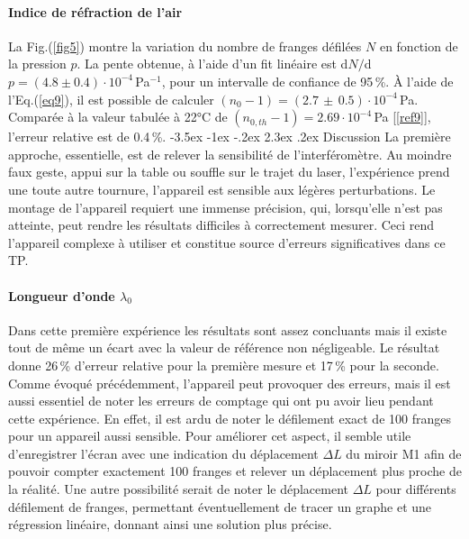 \documentclass[a4paper, 12pt,oneside]{article}
\makeatletter
\renewcommand{\section}{\@startsection {section}{1}{\z@}%
             {-3.5ex \@plus -1ex \@minus -.2ex}%
             {2.3ex \@plus.2ex}%
             {\normalfont\normalsize\bfseries}}
\makeatother
\begin{document}
\paragraph{Indice de réfraction de l'air}

La Fig.(\ref{fig5}) montre la variation du nombre de franges défilées $N$ en fonction de la pression $p$. La pente obtenue, à l'aide d'un fit linéaire est d$N/$d$p=(4.8\pm0.4) \cdot 10^{-4}$\,Pa$^{-1}$, pour un intervalle de confiance de 95\,\%. À l'aide de l'Eq.(\ref{eq9}), il est possible de calculer $(n_0 - 1) = (2.7 \,\pm\, 0.5) \cdot 10^{-4}$\,Pa. Comparée à la valeur tabulée à 22°C de $(n_{0,th} - 1) = 2.69 \cdot 10^{-4}$\,Pa  [\ref{ref9}], l'erreur relative est de 0.4\,\%.
\vspace{-0.3cm}
\section{Discussion}
\vspace{-0.3cm}
La première approche, essentielle, est de relever la sensibilité de l'interféromètre. Au moindre faux geste, appui sur la table ou souffle sur le trajet du laser, l'expérience prend une toute autre tournure, l'appareil est sensible aux légères perturbations. Le montage de l'appareil requiert une immense précision, qui, lorsqu'elle n'est pas  atteinte, peut rendre les résultats difficiles à correctement mesurer. Ceci rend l'appareil complexe à utiliser et constitue source d'erreurs significatives dans ce TP.

\paragraph{Longueur d'onde $\lambda _0$}

Dans cette première expérience les résultats sont assez concluants mais il existe tout de même un écart avec la valeur de référence non négligeable. Le résultat donne 26\,\% d'erreur relative pour la première mesure et 17\,\% pour la seconde. Comme évoqué précédemment, l'appareil peut provoquer des erreurs, mais il est aussi essentiel de noter les erreurs de comptage qui ont pu avoir lieu pendant cette expérience. En effet, il est ardu de noter le défilement exact de 100 franges pour un appareil aussi sensible. Pour améliorer cet aspect, il semble utile d'enregistrer l'écran avec une indication du déplacement $\Delta L$ du miroir M1 afin de pouvoir compter exactement 100 franges et relever un déplacement plus proche de la réalité. Une autre possibilité serait de noter le déplacement $\Delta L$ pour différents défilement de franges, permettant éventuellement de tracer un graphe et une régression linéaire, donnant ainsi une solution plus précise.
\end{document}
